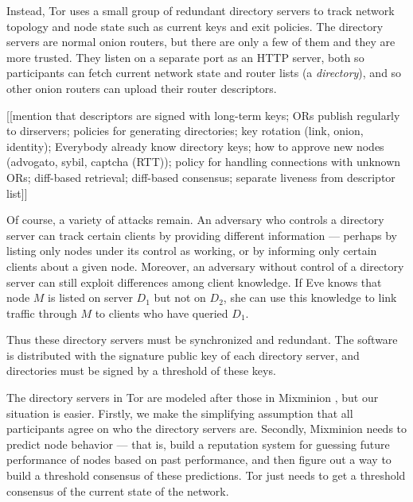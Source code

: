 \documentclass[times,10pt,twocolumn]{article}
\begin{document}
Instead, Tor uses a small group of redundant directory servers to
track network topology and node state such as current keys and exit
policies. The directory servers are normal onion routers, but there are
only a few of them and they are more trusted. They listen on a separate
port as an HTTP server, both so participants can fetch current network
state and router lists (a \emph{directory}), and so other onion routers
can upload their router descriptors.

[[mention that descriptors are signed with long-term keys; ORs publish
    regularly to dirservers; policies for generating directories; key
    rotation (link, onion, identity); Everybody already know directory
    keys; how to approve new nodes (advogato, sybil, captcha (RTT));
    policy for handling connections with unknown ORs; diff-based
    retrieval; diff-based consensus; separate liveness from descriptor
    list]]

Of course, a variety of attacks remain. An adversary who controls a
directory server can track certain clients by providing different
information --- perhaps by listing only nodes under its control
as working, or by informing only certain clients about a given
node. Moreover, an adversary without control of a directory server can
still exploit differences among client knowledge. If Eve knows that
node $M$ is listed on server $D_1$ but not on $D_2$, she can use this
knowledge to link traffic through $M$ to clients who have queried $D_1$.

Thus these directory servers must be synchronized and redundant. The
software is distributed with the signature public key of each directory
server, and directories must be signed by a threshold of these keys.

The directory servers in Tor are modeled after those in Mixminion
\cite{minion-design}, but our situation is easier. Firstly, we make the
simplifying assumption that all participants agree on who the directory
servers are. Secondly, Mixminion needs to predict node behavior ---
that is, build a reputation system for guessing future performance of
nodes based on past performance, and then figure out a way to build
a threshold consensus of these predictions. Tor just needs to get a
threshold consensus of the current state of the network.
\end{document}
